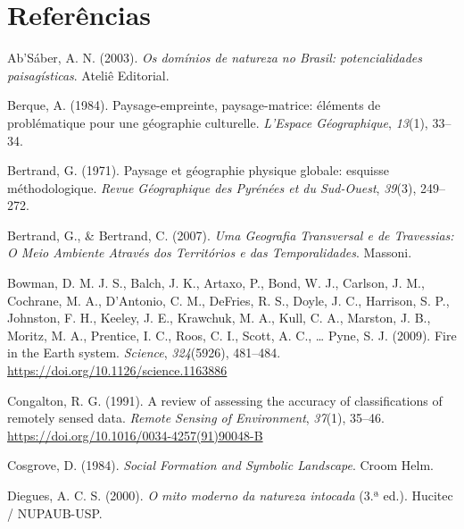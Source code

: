 \documentclass[
  portuguese,
  11pt,
  a4paper,
  open=any]{scrbook}
\newlength{\cslhangindent}
\newenvironment{CSLReferences}[2] %
 {\begin{list}{}{%
  \setlength{\itemindent}{0pt}
  \setlength{\leftmargin}{0pt}
  \setlength{\parsep}{0pt}
  \ifodd #1
   \setlength{\leftmargin}{\cslhangindent}
   \setlength{\itemindent}{-1\cslhangindent}
  \fi
  \setlength{\itemsep}{#2\baselineskip}}}
 {\end{list}}
\begin{document}

\chapter*{Referências}\label{referuxeancias}


\label{refs}
\begin{CSLReferences}{1}{0}
Ab'Sáber, A. N. (2003). \emph{Os domínios de natureza no Brasil:
potencialidades paisagísticas}. Ateliê Editorial.

Berque, A. (1984). Paysage-empreinte, paysage-matrice: éléments de
problématique pour une géographie culturelle. \emph{L'Espace
Géographique}, \emph{13}(1), 33--34.

Bertrand, G. (1971). Paysage et géographie physique globale: esquisse
méthodologique. \emph{Revue Géographique des Pyrénées et du Sud-Ouest},
\emph{39}(3), 249--272.

Bertrand, G., \& Bertrand, C. (2007). \emph{Uma Geografia Transversal e
de Travessias: O Meio Ambiente Através dos Territórios e das
Temporalidades}. Massoni.

Bowman, D. M. J. S., Balch, J. K., Artaxo, P., Bond, W. J., Carlson, J.
M., Cochrane, M. A., D'Antonio, C. M., DeFries, R. S., Doyle, J. C.,
Harrison, S. P., Johnston, F. H., Keeley, J. E., Krawchuk, M. A., Kull,
C. A., Marston, J. B., Moritz, M. A., Prentice, I. C., Roos, C. I.,
Scott, A. C., \ldots{} Pyne, S. J. (2009). Fire in the Earth system.
\emph{Science}, \emph{324}(5926), 481--484.
\url{https://doi.org/10.1126/science.1163886}

Congalton, R. G. (1991). A review of assessing the accuracy of
classifications of remotely sensed data. \emph{Remote Sensing of
Environment}, \emph{37}(1), 35--46.
\url{https://doi.org/10.1016/0034-4257(91)90048-B}

Cosgrove, D. (1984). \emph{Social Formation and Symbolic Landscape}.
Croom Helm.

Diegues, A. C. S. (2000). \emph{O mito moderno da natureza intocada}
(3.ª ed.). Hucitec / NUPAUB-USP.


\end{CSLReferences}
\end{document}
